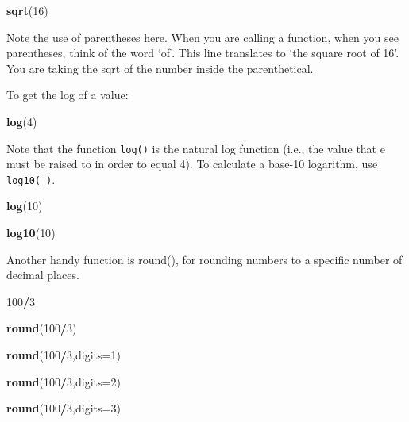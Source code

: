 \documentclass[
]{book}
\newenvironment{Shaded}{\begin{snugshade}}{\end{snugshade}}
\newcommand{\AttributeTok}[1]{\textcolor[rgb]{0.13,0.29,0.53}{#1}}
\newcommand{\DecValTok}[1]{\textcolor[rgb]{0.00,0.00,0.81}{#1}}
\newcommand{\FunctionTok}[1]{\textcolor[rgb]{0.13,0.29,0.53}{\textbf{#1}}}
\newcommand{\NormalTok}[1]{#1}
\newcommand{\SpecialCharTok}[1]{\textcolor[rgb]{0.81,0.36,0.00}{\textbf{#1}}}
\begin{document}
\begin{Shaded}
\begin{Highlighting}[]
\FunctionTok{sqrt}\NormalTok{(}\DecValTok{16}\NormalTok{)}
\end{Highlighting}
\end{Shaded}

Note the use of parentheses here. When you are calling a function, when you see parentheses, think of the word `of'. This line translates to `the square root of 16'. You are taking the sqrt of the number inside the parenthetical.

To get the log of a value:

\begin{Shaded}
\begin{Highlighting}[]
\FunctionTok{log}\NormalTok{(}\DecValTok{4}\NormalTok{)}
\end{Highlighting}
\end{Shaded}

Note that the function \texttt{log()} is the natural log function (i.e., the value that e must be raised to in order to equal 4). To calculate a base-10 logarithm, use \texttt{log10(\ )}.

\begin{Shaded}
\begin{Highlighting}[]
\FunctionTok{log}\NormalTok{(}\DecValTok{10}\NormalTok{)}

\FunctionTok{log10}\NormalTok{(}\DecValTok{10}\NormalTok{)}
\end{Highlighting}
\end{Shaded}

Another handy function is round(), for rounding numbers to a specific number of decimal places.

\begin{Shaded}
\begin{Highlighting}[]
\DecValTok{100}\SpecialCharTok{/}\DecValTok{3}

\FunctionTok{round}\NormalTok{(}\DecValTok{100}\SpecialCharTok{/}\DecValTok{3}\NormalTok{)}

\FunctionTok{round}\NormalTok{(}\DecValTok{100}\SpecialCharTok{/}\DecValTok{3}\NormalTok{,}\AttributeTok{digits=}\DecValTok{1}\NormalTok{)}

\FunctionTok{round}\NormalTok{(}\DecValTok{100}\SpecialCharTok{/}\DecValTok{3}\NormalTok{,}\AttributeTok{digits=}\DecValTok{2}\NormalTok{)}

\FunctionTok{round}\NormalTok{(}\DecValTok{100}\SpecialCharTok{/}\DecValTok{3}\NormalTok{,}\AttributeTok{digits=}\DecValTok{3}\NormalTok{)}
\end{Highlighting}
\end{Shaded}
\end{document}
